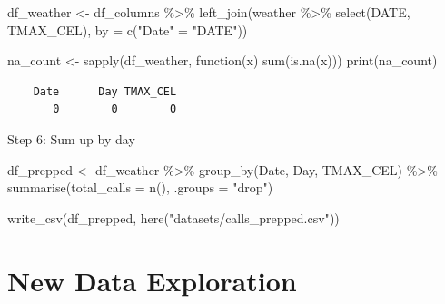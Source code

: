 \documentclass[
  letterpaper,
  DIV=11,
  numbers=noendperiod]{scrartcl}
\newenvironment{Shaded}{\begin{snugshade}}{\end{snugshade}}
\newcommand{\AttributeTok}[1]{\textcolor[rgb]{0.40,0.45,0.13}{#1}}
\newcommand{\ControlFlowTok}[1]{\textcolor[rgb]{0.00,0.23,0.31}{#1}}
\newcommand{\FunctionTok}[1]{\textcolor[rgb]{0.28,0.35,0.67}{#1}}
\newcommand{\NormalTok}[1]{\textcolor[rgb]{0.00,0.23,0.31}{#1}}
\newcommand{\OtherTok}[1]{\textcolor[rgb]{0.00,0.23,0.31}{#1}}
\newcommand{\SpecialCharTok}[1]{\textcolor[rgb]{0.37,0.37,0.37}{#1}}
\newcommand{\StringTok}[1]{\textcolor[rgb]{0.13,0.47,0.30}{#1}}
\begin{document}
\begin{Shaded}
\begin{Highlighting}[]
\NormalTok{df\_weather }\OtherTok{\textless{}{-}}\NormalTok{ df\_columns }\SpecialCharTok{\%\textgreater{}\%}
  \FunctionTok{left\_join}\NormalTok{(weather }\SpecialCharTok{\%\textgreater{}\%} \FunctionTok{select}\NormalTok{(DATE, TMAX\_CEL), }\AttributeTok{by =} \FunctionTok{c}\NormalTok{(}\StringTok{"Date"} \OtherTok{=} \StringTok{"DATE"}\NormalTok{))}
\end{Highlighting}
\end{Shaded}

\begin{Shaded}
\begin{Highlighting}[]
\NormalTok{na\_count }\OtherTok{\textless{}{-}} \FunctionTok{sapply}\NormalTok{(df\_weather, }\ControlFlowTok{function}\NormalTok{(x) }\FunctionTok{sum}\NormalTok{(}\FunctionTok{is.na}\NormalTok{(x)))}
\FunctionTok{print}\NormalTok{(na\_count)}
\end{Highlighting}
\end{Shaded}

\begin{verbatim}
    Date      Day TMAX_CEL 
       0        0        0 
\end{verbatim}

Step 6: Sum up by day

\begin{Shaded}
\begin{Highlighting}[]
\NormalTok{df\_prepped }\OtherTok{\textless{}{-}}\NormalTok{ df\_weather }\SpecialCharTok{\%\textgreater{}\%}
  \FunctionTok{group\_by}\NormalTok{(Date, Day, TMAX\_CEL) }\SpecialCharTok{\%\textgreater{}\%}
  \FunctionTok{summarise}\NormalTok{(}\AttributeTok{total\_calls =} \FunctionTok{n}\NormalTok{(), }\AttributeTok{.groups =} \StringTok{"drop"}\NormalTok{)}
\end{Highlighting}
\end{Shaded}

\begin{Shaded}
\begin{Highlighting}[]
\FunctionTok{write\_csv}\NormalTok{(df\_prepped, }\FunctionTok{here}\NormalTok{(}\StringTok{"datasets/calls\_prepped.csv"}\NormalTok{))}
\end{Highlighting}
\end{Shaded}

\section{New Data Exploration}\label{new-data-exploration}
\end{document}
